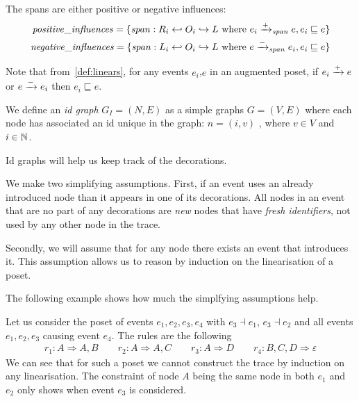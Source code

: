 
The spans are either positive or negative influences:
\begin{align*}
  \mathit{positive\_influences} = \{ \mathit{span}:R_i\hookleftarrow O_i\hookrightarrow L \text{ where } e_i\mathrel{\xrightarrow{+}}_{\mathit{span}} e, e_i\sqsubseteq e\} \\
  \mathit{negative\_influences} = \{ \mathit{span}:L_i\hookleftarrow O_i\hookrightarrow L \text{ where } e\mathrel{\xrightarrow{-}}_{\mathit{span}} e_i, e_i\sqsubseteq e\}
\end{align*}

Note that from~\autoref{def:linears}, for any events $e_i$,$e$ in an augmented poset, if $e_i\mathrel{\xrightarrow{+}} e$ or $e\mathrel{\xrightarrow{-}}e_i$ then $e_i\sqsubseteq e$.

\begin{definition}[Id graphs]
  We define an \emph{id graph} $G_I = (N,E)$ as a simple graphs $G = (V,E)$ where each node has associated an id unique in the graph: $n=(i,v)$ , where $v\in V$ and $i\in\mathbb{N}$.
\end{definition}

Id graphs will help us keep track of the decorations.

\begin{remark}
\label{rm:simply}
  We make two simplifying assumptions. First, if an event uses an already introduced node than it appears in one of its decorations. All nodes in an event that are no part of any decorations are \emph{new} nodes that have \emph{fresh identifiers}, not used by any other node in the trace.

Secondly, we will assume that for any node there exists an event that introduces it. This assumption allows us to reason by induction on the linearisation of a poset.
\end{remark}

The following example shows how much the simplfying assumptions help.
\begin{example}
 Let us consider the poset of events $e_1,e_2,e_3,e_4$ with $e_3\dashv e_1$, $e_3\dashv e_2$ and all events $e_1,e_2,e_3$ causing event $e_4$. The rules are the following
 \begin{align*}
   r_1:A \Rightarrow A,B\qquad r_2:A \Rightarrow A,C \qquad r_3:A\Rightarrow D\qquad r_4:B,C,D\Rightarrow \varepsilon
 \end{align*}
 We can see that for such a poset we cannot construct the trace by induction on any linearisation. The constraint of node $A$ being the same node in both $e_1$ and $e_2$ only shows when event $e_3$ is considered.
\end{example}

